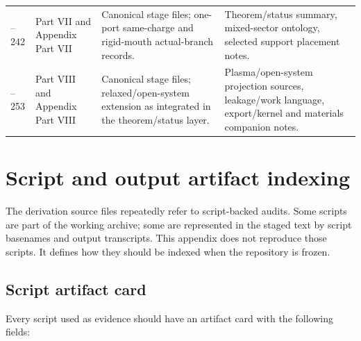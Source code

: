 \begin{longtable}{@{}L{0.10\textwidth}L{0.22\textwidth}L{0.32\textwidth}L{0.25\textwidth}@{}}
--242 & Part VII and Appendix Part VII & Canonical stage files; one-port same-charge and rigid-mouth actual-branch records. & Theorem/status summary, mixed-sector ontology, selected support placement notes. \\
--253 & Part VIII and Appendix Part VIII & Canonical stage files; relaxed/open-system extension as integrated in the theorem/status layer. & Plasma/open-system projection sources, leakage/work language, export/kernel and materials companion notes. \\
\bottomrule
\end{longtable}

\section{Script and output artifact indexing}
\label{sec:script-output-indexing}

The derivation source files repeatedly refer to script-backed audits.  Some scripts are part of the working archive; some are represented in the staged text by script basenames and output transcripts.  This appendix does not reproduce those scripts.  It defines how they should be indexed when the repository is frozen.

\subsection{Script artifact card}
\label{subsec:script-artifact-card}

Every script used as evidence should have an artifact card with the following fields:


